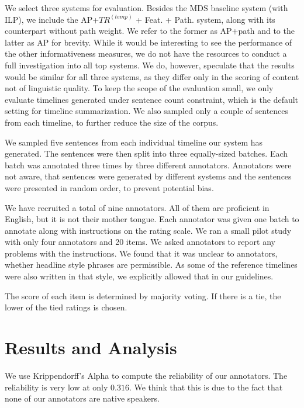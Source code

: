 \documentclass[a4paper,BCOR=10mm]{report}
\numberwithin{lemma}{chapter}
\numberwithin{definition}{chapter}
\begin{document}
We select three systems for evaluation. Besides the MDS baseline system (with ILP), we include the AP+$TR^{(temp)}$ + Feat. + Path. system, along with its counterpart without path weight. We refer to the former as AP+path and to the latter as AP for brevity. While it would be interesting to see the performance of the other informativeness measures, we do not have the resources to conduct a full investigation into all top systems.
We do, however, speculate that the results would be similar for all three systems, as they differ only in the scoring of content not of linguistic quality.
To keep the scope of the evaluation small, we only evaluate timelines generated under sentence count constraint, which is the default setting for timeline summarization. We also sampled only a couple of sentences from each timeline, to further reduce the size of the corpus.

We sampled five sentences from each individual timeline our system has generated.
The sentences were then split into three equally-sized batches. Each batch was annotated three times by three different annotators.
Annotators were not aware, that sentences were generated by different systems and the sentences were presented in random order, to prevent potential bias.

We have recruited a total of nine annotators. All of them are proficient in English, but it is not their mother tongue.
Each annotator was given one batch to annotate along with instructions on the rating scale. We ran a small pilot study with only four annotators and 20 items. We asked annotators to report any problems with the instructions. We found that it was unclear to annotators, whether headline style phrases are permissible.
As some of the reference timelines were also written in that style, we explicitly allowed that in our guidelines.

The score of each item is determined by majority voting. If there is a tie, the lower of the tied ratings is chosen.

\section{Results and Analysis}

We use Krippendorff's Alpha \citep{krippendorff} to compute the reliability of our annotators.
The reliability is very low at only $0.316$. We think that this is due to the fact that none of our annotators are native speakers.
\end{document}
